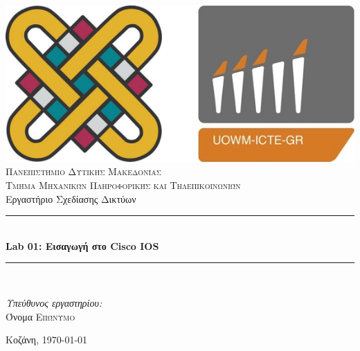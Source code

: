 \documentclass[12pt]{article}
\begin{document}
	
\begin{titlepage}
		
\newcommand{\HRule}{\rule{\linewidth}{0.5mm}} %
		
\centering %
\includegraphics[scale=0.4]{icte-uowm}\\[1cm]
		
\textsc{\Huge \myfont Πανεπιστήμιο Δυτικήσ Μακεδονίασ}\\[0.5cm] %
\textsc{\Large \myfont Τμήμα Μηχανικών Πληροφορικήσ και Τηλεπικοινωνιών}\\[0.5cm] %
\large{Εργαστήριο Σχεδίασης Δικτύων}\\[0.1cm] %

		
\HRule \\[0.5cm] {\LARGE \bfseries Lab 01: Εισαγωγή στο Cisco IOS}\\ %
\HRule \\[1.25cm]

		
\begin{minipage}{0.85\textwidth}
	\myfont
	\begin{flushleft}
		\emph{Υπεύθυνος εργαστηρίου:}\\
		Όνομα \textsc{Επώνυμο}\\
	\end{flushleft}
\end{minipage}
						
\vfill %
						
						
{\large Κοζάνη, \today} %
						
\end{titlepage}
\end{document}

